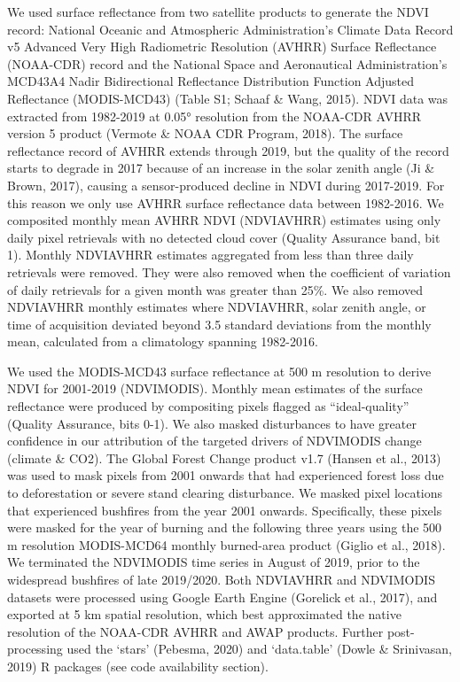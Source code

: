 \documentclass[gc, manuscript]{copernicus}
\begin{document}
We used surface reflectance from two satellite products to generate the
NDVI record: National Oceanic and Atmospheric Administration's Climate
Data Record v5 Advanced Very High Radiometric Resolution (AVHRR) Surface
Reflectance (NOAA-CDR) record and the National Space and Aeronautical
Administration's MCD43A4 Nadir Bidirectional Reflectance Distribution
Function Adjusted Reflectance (MODIS-MCD43) (Table S1; Schaaf \& Wang,
2015). NDVI data was extracted from 1982-2019 at 0.05° resolution from
the NOAA-CDR AVHRR version 5 product (Vermote \& NOAA CDR Program,
2018). The surface reflectance record of AVHRR extends through 2019, but
the quality of the record starts to degrade in 2017 because of an
increase in the solar zenith angle (Ji \& Brown, 2017), causing a
sensor-produced decline in NDVI during 2017-2019. For this reason we
only use AVHRR surface reflectance data between 1982-2016. We composited
monthly mean AVHRR NDVI (NDVIAVHRR) estimates using only daily pixel
retrievals with no detected cloud cover (Quality Assurance band, bit 1).
Monthly NDVIAVHRR estimates aggregated from less than three daily
retrievals were removed. They were also removed when the coefficient of
variation of daily retrievals for a given month was greater than 25\%.
We also removed NDVIAVHRR monthly estimates where NDVIAVHRR, solar
zenith angle, or time of acquisition deviated beyond 3.5 standard
deviations from the monthly mean, calculated from a climatology spanning
1982-2016.

We used the MODIS-MCD43 surface reflectance at 500 m resolution to
derive NDVI for 2001-2019 (NDVIMODIS). Monthly mean estimates of the
surface reflectance were produced by compositing pixels flagged as
``ideal-quality'' (Quality Assurance, bits 0-1). We also masked
disturbances to have greater confidence in our attribution of the
targeted drivers of NDVIMODIS change (climate \& CO2). The Global Forest
Change product v1.7 (Hansen et al., 2013) was used to mask pixels from
2001 onwards that had experienced forest loss due to deforestation or
severe stand clearing disturbance. We masked pixel locations that
experienced bushfires from the year 2001 onwards. Specifically, these
pixels were masked for the year of burning and the following three years
using the 500 m resolution MODIS-MCD64 monthly burned-area product
(Giglio et al., 2018). We terminated the NDVIMODIS time series in August
of 2019, prior to the widespread bushfires of late 2019/2020. Both
NDVIAVHRR and NDVIMODIS datasets were processed using Google Earth
Engine (Gorelick et al., 2017), and exported at 5 km spatial resolution,
which best approximated the native resolution of the NOAA-CDR AVHRR and
AWAP products. Further post-processing used the `stars' (Pebesma, 2020)
and `data.table' (Dowle \& Srinivasan, 2019) R packages (see code
availability section).
\end{document}
